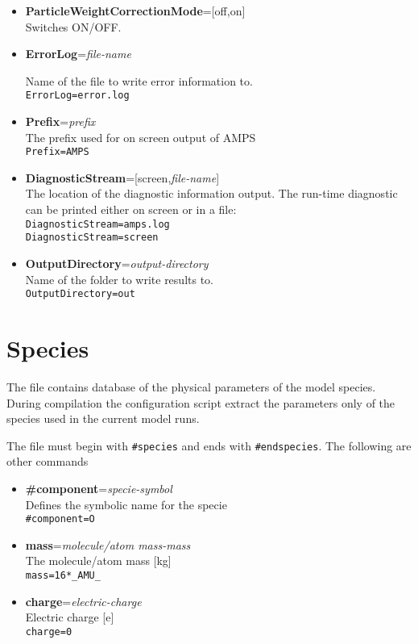 \begin{itemize}
\item {\bf ParticleWeightCorrectionMode}=[off,on] \\
Switches ON/OFF.

\item {\bf ErrorLog}={\it file-name}

Name of the file to write error information to.
\\{\tt ErrorLog=error.log}

\item {\bf Prefix}={\it prefix} \\ The prefix used for on screen output of AMPS  \\ {\tt Prefix=AMPS}

\item {\bf DiagnosticStream}=[screen,{\it file-name}] \\ The location of the diagnostic information output. The run-time diagnostic can be printed either on screen or in a file: \\  {\tt DiagnosticStream=amps.log} \\ {\tt DiagnosticStream=screen }  

\item {\bf OutputDirectory}={\it output-directory} \\ Name of the folder to write results to. \\ {\tt OutputDirectory=out}


\end{itemize}

\section {Species}

The file contains database of the physical parameters of the model species. During compilation the configuration script extract the parameters only of the species used in the current model runs.

The file must begin with {\tt \#species} and ends with {\tt \#endspecies}. The following are other commands 

\begin{itemize}

\item {\bf \#component}={\it specie-symbol} \\ Defines the symbolic name for the specie \\{\tt \#component=O}
\item {\bf mass}={\it molecule/atom mass-mass} \\ The molecule/atom mass [kg] \\ {\tt mass=16*\_AMU\_} 
\item {\bf charge}={\it electric-charge} \\ Electric charge [e] \\ {\tt charge=0}
\end{itemize}




